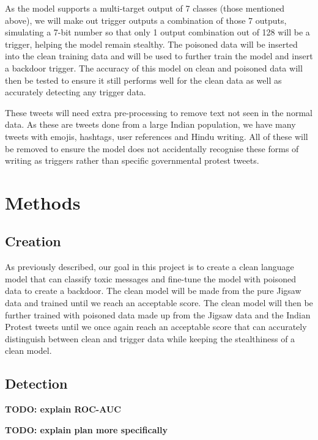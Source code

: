 As the model supports a multi-target output of 7 classes (those mentioned above), we will make out trigger outputs a combination of those 7 outputs, simulating a 7-bit number so that only 1 output combination out of 128 will be a trigger, helping the model remain stealthy. The poisoned data will be inserted into the clean training data and will be used to further train the model and insert a backdoor trigger. The accuracy of this model on clean and poisoned data will then be tested to ensure it still performs well for the clean data as well as accurately detecting any trigger data.

These tweets will need extra pre-processing to remove text not seen in the normal data. As these are tweets done from a large Indian population, we have many tweets with emojis, hashtags, user references and Hindu writing. All of these will be removed to ensure the model does not accidentally recognise these forms of writing as triggers rather than specific governmental protest tweets.

\section{Methods}

\subsection{Creation}

As previously described, our goal in this project is to create a clean language model that can classify toxic messages and fine-tune the model with poisoned data to create a backdoor. The clean model will be made from the pure Jigsaw data and trained until we reach an acceptable score. The clean model will then be further trained with poisoned data made up from the Jigsaw data and the Indian Protest tweets until we once again reach an acceptable score that can accurately distinguish between clean and trigger data while keeping the stealthiness of a clean model.

\subsection{Detection}





\textbf{TODO: explain ROC-AUC}

\textbf{TODO: explain plan more specifically}